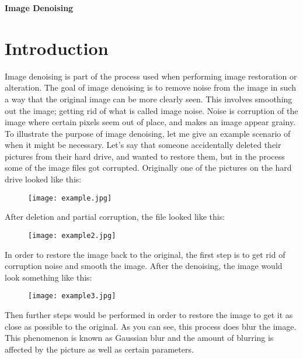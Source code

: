 \documentclass[12pt]{article}
\begin{document}
\centerline{\Large\textbf{Image Denoising}}
\vspace{0cm}


\section{Introduction}\label{sec::Intro}
Image denoising is part of the process used when performing image restoration or alteration. The goal of image denoising is to remove noise from the image in such a way that the original image can be more clearly seen. This involves smoothing out the image; getting rid of what is called image noise. Noise is corruption of the image where certain pixels seem out of place, and makes an image appear grainy. To illustrate the purpose of image denoising, let me give an example scenario of when it might be necessary. Let's say that someone accidentally deleted their pictures from their hard drive, and wanted to restore them, but in the process some of the image files got corrupted. Originally one of the pictures on the hard drive looked like this:
\begin{figure}[H]
\centering
    \texttt{[image: example.jpg]}

\end{figure}
After deletion and partial corruption, the file looked like this:
\begin{figure}[H]
\centering
    \texttt{[image: example2.jpg]}

\end{figure}
In order to restore the image back to the original, the first step is to get rid of corruption noise and smooth the image. After the denoising, the image would look something like this:
\begin{figure}[H]
\centering
    \texttt{[image: example3.jpg]}

\end{figure}
Then further steps would be performed in order to restore the image to get it as close as possible to the original. As you can see, this process does blur the image. This phenomenon is known as Gaussian blur and the amount of blurring is affected by the picture as well as certain parameters.
\end{document}
